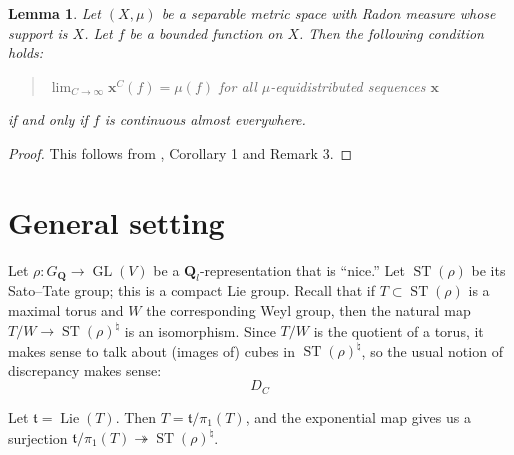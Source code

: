 \documentclass{article}
\DeclareMathOperator{\GL}{GL}
\DeclareMathOperator{\Lie}{Lie}
\DeclareMathOperator{\ST}{ST}
\newcommand{\bQ}{\mathbf{Q}}
\newcommand{\bx}{\boldsymbol{x}}
\newcommand{\ft}{\mathfrak{t}}
\newtheorem{lemma}[theorem]{Lemma}
\theoremstyle{definition}
\numberwithin{theorem}{section}
\begin{document}
\begin{lemma}
Let $(X,\mu)$ be a separable metric space with Radon measure whose support is 
$X$. Let $f$ be a bounded function on $X$. Then the following condition holds:
\begin{quote}
$\lim_{C\to \infty} \bx^C(f) = \mu(f)$ for all $\mu$-equidistributed sequences $\bx$
\end{quote}
if and only if $f$ is continuous almost everywhere.
\end{lemma}
\begin{proof}
This follows from \cite{chersi-volcic-1992}, Corollary 1 and Remark 3. 
\end{proof}





\section{General setting}

Let $\rho\colon G_\bQ\to \GL(V)$ be a $\bQ_l$-representation that is ``nice.'' Let 
$\ST(\rho)$ be its Sato--Tate group; this is a compact Lie group. Recall that if 
$T\subset \ST(\rho)$ is a maximal torus and $W$ the corresponding Weyl group, 
then the natural map $T/W\to \ST(\rho)^\natural$ is an isomorphism. Since $T/W$ 
is the quotient of a torus, it makes sense to talk about (images of) cubes in 
$\ST(\rho)^\natural$, so the usual notion of discrepancy makes sense:
\[
	D_C
\]

Let $\ft=\Lie(T)$. Then $T=\ft/\pi_1(T)$, and the exponential map gives us a 
surjection $\ft/\pi_1(T) \twoheadrightarrow \ST(\rho)^\natural$. 





\printbibliography
\end{document}
